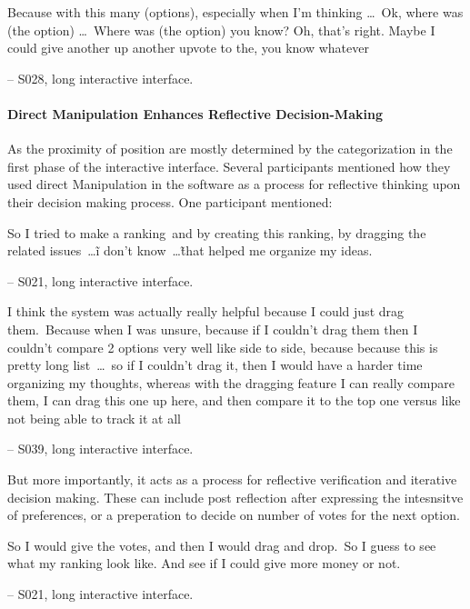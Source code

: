 \begin{displayquote}
    Because with this many (options), especially when I'm thinking \ldots\ Ok, where was (the option) \ldots\ Where was (the option) you know? Oh, that's right. Maybe I could give another up another upvote to the, you know whatever~\bracketellipsis
        
        \noindent \hfill -- S028, long interactive interface.
\end{displayquote}

\paragraph{Direct Manipulation Enhances Reflective Decision-Making}
As the proximity of position are mostly determined by the categorization in the first phase of the interactive interface. Several participants mentioned how they used direct Manipulation in the software as a process for reflective thinking upon their decision making process. One participant mentioned:

\begin{displayquote}
So I tried to make a ranking~\bracketellipsis and by creating this ranking, by dragging the related issues~\ldots\~i don’t know~\ldots\~that helped me organize my ideas.
    
\noindent \hfill -- S021, long interactive interface.
\end{displayquote}

\begin{displayquote}
I think the system was actually really helpful because I could just drag them.~\bracketellipsis Because when I was unsure, because if I couldn't drag them then I couldn't compare 2 options very well like side to side, because because this is pretty long list~\ldots\ so if I couldn't drag it, then I would have a harder time organizing my thoughts, whereas  with the dragging feature I can really compare them, I can drag this one up here, and then compare it to the top one versus like not being able to track it at all
    
\noindent \hfill -- S039, long interactive interface.
\end{displayquote}


But more importantly, it acts as a process for reflective verification and iterative decision making. These can include post reflection after expressing the intesnsitve of preferences, or a preperation to decide on number of votes for the next option.


\begin{displayquote}
So I would give the votes, and then I would drag and drop.~\bracketellipsis So I guess to see what my ranking look like. And see if I could give more money or not.
    
\noindent \hfill -- S021, long interactive interface.
\end{displayquote}

